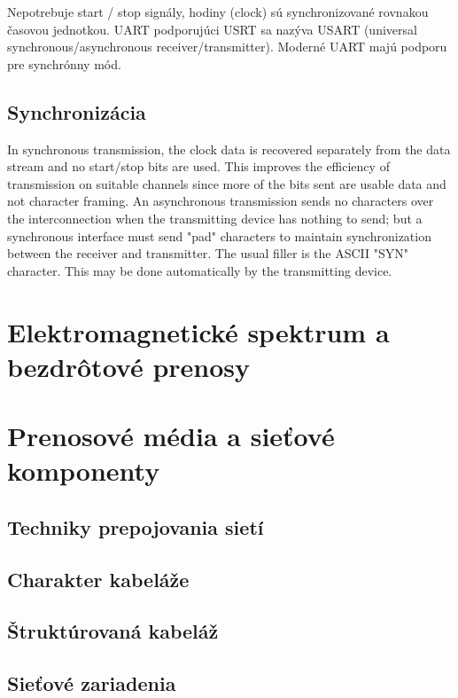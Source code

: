 \documentclass[10pt,a4paper]{article}
\begin{document}
Nepotrebuje start / stop signály, hodiny (clock) sú synchronizované rovnakou časovou jednotkou.
UART podporujúci USRT sa nazýva USART (universal synchronous/asynchronous receiver/transmitter).
Moderné UART majú podporu pre synchrónny mód. 
  
\subsection{Synchronizácia}   
In synchronous transmission, the clock data is recovered separately from the data stream and no start/stop bits are used. This improves the efficiency of transmission on suitable channels since more of the bits sent are usable data and not character framing. An asynchronous transmission sends no characters over the interconnection when the transmitting device has nothing to send; but a synchronous interface must send "pad" characters to maintain synchronization between the receiver and transmitter. The usual filler is the ASCII "SYN" character. This may be done automatically by the transmitting device.

\section{Elektromagnetické spektrum a bezdrôtové prenosy}  


\section{Prenosové média a sieťové komponenty} 
\subsection{Techniky prepojovania sietí}  
\subsection{Charakter kabeláže}     
\subsection{Štruktúrovaná kabeláž}  
\subsection{Sieťové zariadenia}           
\end{document}
